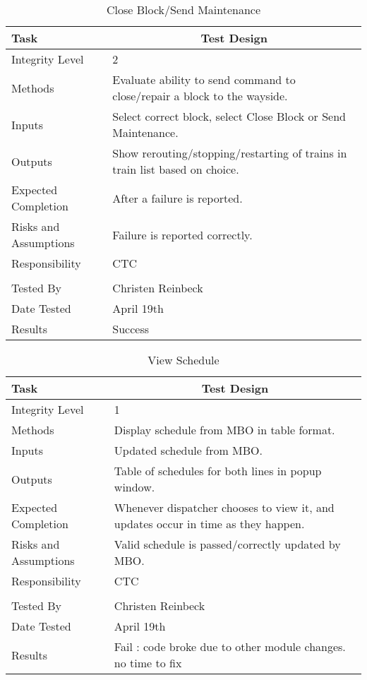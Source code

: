 \documentclass[]{article}
\begin{document}
\begin{table}[H]
	\centering
	\caption{Close Block/Send Maintenance}
	\begin{tabular}{|l|l|}
		\hline
		Task & \multicolumn{1}{c|}{Test Design} \\ \hline
		Integrity Level & 2 \\ \hline
		Methods & \parbox[t]{10cm}{Evaluate ability to send command to close/repair a block to the wayside.}\\ \hline
		Inputs &  Select correct block, select Close Block or Send Maintenance. \\ \hline
		Outputs &  \parbox[t]{10cm}{Show rerouting/stopping/restarting of trains in train list based on choice.}\\ \hline
		Expected Completion & After a failure is reported.\\ \hline
		Risks and Assumptions & \parbox[t]{10cm}{Failure is reported correctly.} \\ \hline
		Responsibility & CTC\\ \hline
		\\ \hline
		Tested By   &  Christen Reinbeck\\	\hline
		Date Tested & \parbox[t]{10cm}{April 19th}\\ \hline
		Results & Success\\ \hline
	\end{tabular}
\end{table}

\begin{table}[H]
	\centering
	\caption{View Schedule}
	\begin{tabular}{|l|l|}
		\hline
		Task & \multicolumn{1}{c|}{Test Design} \\ \hline
		Integrity Level & 1 \\ \hline
		Methods & Display schedule from MBO in table format.\\ \hline
		Inputs &  Updated schedule from MBO. \\ \hline
		Outputs &  Table of schedules for both lines in popup window. \\ \hline
		Expected Completion & \parbox[t]{10cm}{Whenever dispatcher chooses to view it, and updates occur in time as they happen.}\\ \hline
		Risks and Assumptions & \parbox[t]{10cm}{Valid schedule is passed/correctly updated by MBO.} \\ \hline
		Responsibility & CTC\\ \hline
		\\ \hline
		Tested By   &  Christen Reinbeck\\	\hline
		Date Tested & \parbox[t]{10cm}{April 19th}\\ \hline
		Results & Fail : code broke due to other module changes. no time to fix\\ \hline
	\end{tabular}
\end{table}
\end{document}

